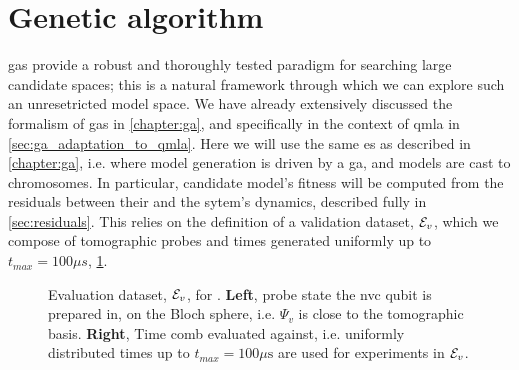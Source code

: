 \section{Genetic algorithm}
\Glspl{ga} provide a robust and thoroughly tested paradigm for searching large candidate spaces; 
    this is a natural framework through which we can explore such an unresetricted model space. 
We have already extensively discussed the formalism of \glspl{ga} in \cref{chapter:ga}, 
    and specifically in the context of \gls{qmla} in \cref{sec:ga_adaptation_to_qmla}.
Here we will use the same \gls{es} as described in \cref{chapter:ga}, 
    i.e. where model generation is driven by a \gls{ga}, 
    and models are cast to chromosomes. 
In particular, candidate model's fitness will be computed from the residuals
    between their and the sytem's dynamics, described fully in \cref{sec:residuals}. 
This  relies on the definition of a validation dataset, ${ \mathcal{E} }_v$,
    which we compose of tomographic probes and times generated uniformly up to 
    $t_{max} = 100 \mu s$, \cref{fig:nv_ga_eval_data}. 

\begin{figure}
    \begin{center}
        \qquad
    \end{center}
    \caption[Evaluation dataset for  ]{
        Evaluation dataset, ${ \mathcal{E} }_v$, for  . 
        \textbf{Left}, \Gls{probe} state the \gls{nvc}  qubit is prepared in, on the Bloch sphere, 
            i.e. $\Psi_v$ is close to the tomographic basis. 
        \textbf{Right}, Time comb evaluated against, i.e. uniformly distributed times up to $t_{max} = 100 \mu \textrm{s}$ 
            are used for experiments in ${ \mathcal{E} }_v$. 
        }
    \label{fig:nv_ga_eval_data}
\end{figure}    

